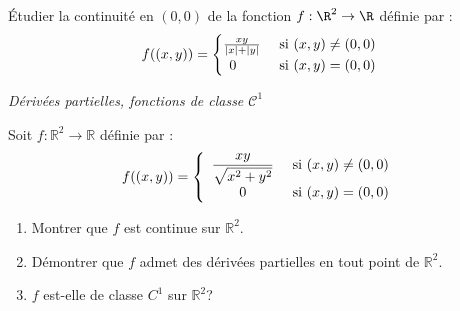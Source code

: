 \documentclass[a4paper,10pt]{report}
\begin{document}
\begin{Exercice}{} Étudier la continuité en $(0,0)$ de la fonction $f : \R^{2} \rightarrow \R$ définie par :
  \[
  f((x,y)) =
  \begin{cases}
    \frac{xy}{\vert x \vert + \vert y \vert} & \hbox{ si } (x,y) \neq (0,0) \\
    \, \; 0 & \hbox{ si } (x,y)=(0,0)
  \end{cases}
  \]
\end{Exercice}


\medskip

\begin{center}
\textit{{ {\large Dérivées partielles, fonctions de classe $\mathcal{C}^1$}}}
\end{center}

\medskip

\begin{Exercice}{} Soit $f : \mathbb{R}^2 \rightarrow \mathbb{R}$ définie par :
$$ f((x,y)) = \left\lbrace \begin{array}{cl}
\dfrac{xy}{\sqrt{x^{2}+y^{2}}} & \hbox{ si } (x,y) \neq (0,0) \\
0 & \hbox{ si } (x,y) = (0,0)\\
\end{array}\right.$$

\begin{enumerate}
\item Montrer que $f$ est continue sur $\mathbb{R}^{2}$.
\item Démontrer que $f$ admet des d\'{e}riv\'{e}es partielles en tout point de $\mathbb{R}^{2}$.
\item $f$ est-elle de classe $C^{1}$ sur $\mathbb{R}^2$?
\end{enumerate}
\end{Exercice}
\end{document}
